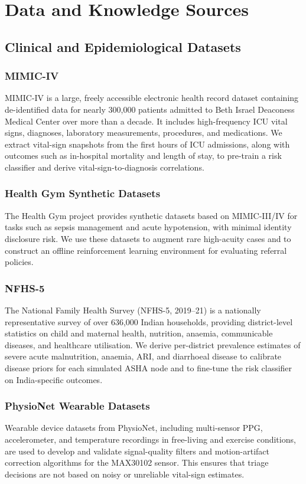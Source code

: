 \documentclass[conference]{IEEEtran}
\begin{document}
\section{Data and Knowledge Sources}
\label{sec:data}

\subsection{Clinical and Epidemiological Datasets}

\subsubsection{MIMIC-IV}
MIMIC-IV is a large, freely accessible electronic health record dataset containing de-identified data for nearly 300,000 patients admitted to Beth Israel Deaconess Medical Center over more than a decade. It includes high-frequency ICU vital signs, diagnoses, laboratory measurements, procedures, and medications. We extract vital-sign snapshots from the first hours of ICU admissions, along with outcomes such as in-hospital mortality and length of stay, to pre-train a risk classifier and derive vital-sign-to-diagnosis correlations.

\subsubsection{Health Gym Synthetic Datasets}
The Health Gym project provides synthetic datasets based on MIMIC-III/IV for tasks such as sepsis management and acute hypotension, with minimal identity disclosure risk. We use these datasets to augment rare high-acuity cases and to construct an offline reinforcement learning environment for evaluating referral policies.

\subsubsection{NFHS-5}
The National Family Health Survey (NFHS-5, 2019--21) is a nationally representative survey of over 636,000 Indian households, providing district-level statistics on child and maternal health, nutrition, anaemia, communicable diseases, and healthcare utilisation. We derive per-district prevalence estimates of severe acute malnutrition, anaemia, ARI, and diarrhoeal disease to calibrate disease priors for each simulated ASHA node and to fine-tune the risk classifier on India-specific outcomes.

\subsubsection{PhysioNet Wearable Datasets}
Wearable device datasets from PhysioNet, including multi-sensor PPG, accelerometer, and temperature recordings in free-living and exercise conditions, are used to develop and validate signal-quality filters and motion-artifact correction algorithms for the MAX30102 sensor. This ensures that triage decisions are not based on noisy or unreliable vital-sign estimates.
\end{document}
